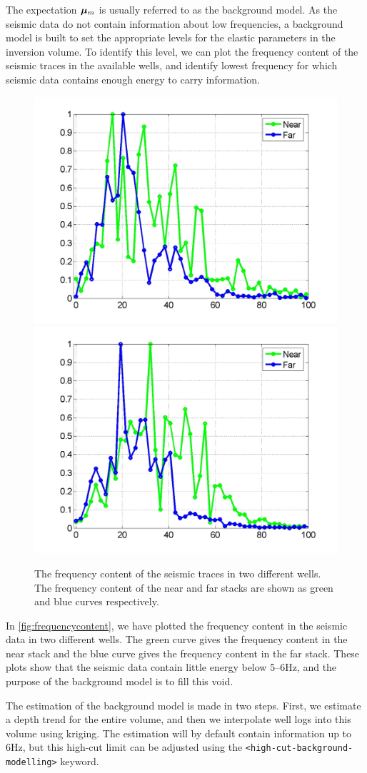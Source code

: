The expectation $\bm\mu_m$ is usually referred to as the background
model. As the seismic data do not contain information about low
frequencies, a background model is built to set the appropriate
levels for the elastic parameters in the inversion volume. To
identify this level, we can plot the frequency content of the seismic
traces in the available wells, and identify lowest frequency for which
seismic data contains enough energy to carry information.

\begin{figure}
\centering
\includegraphics[width=.49\linewidth]{images/implementation/seismicFrequencies_S1}
\includegraphics[width=.49\linewidth]{images/implementation/seismicFrequencies_S2}
\caption{The frequency content of the seismic traces in two different
         wells. The frequency content of the near and far stacks are
         shown as green and blue curves respectively.}
\label{fig:frequencycontent}
\end{figure}

In \autoref{fig:frequencycontent}, we have plotted the frequency content
in the seismic data in two different wells. The green curve gives the
frequency content in the near stack and the blue curve gives the
frequency content in the far stack. These plots show that the seismic
data contain little energy below 5--6Hz, and the purpose of the
background model is to fill this void.

The estimation of the background model is made in two steps. First,
we estimate a depth trend for the entire volume, and then we
interpolate well logs into this volume using kriging. The estimation
will by default contain information up to 6Hz, but this high-cut limit
can be adjusted using the \texttt{<high-cut-background-modelling>}
keyword.

